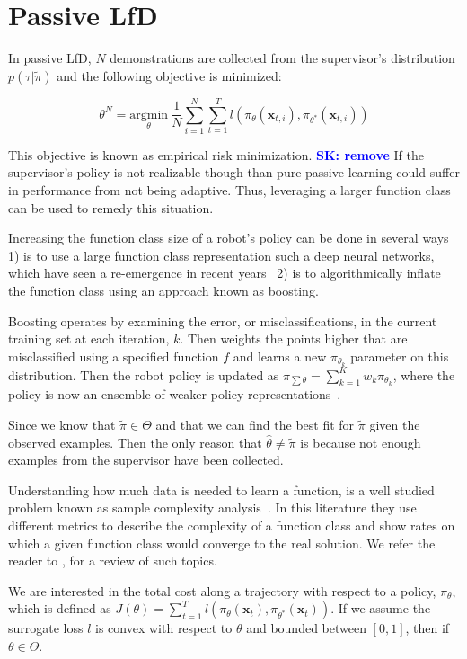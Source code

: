 \documentclass[10pt, conference]{ieeeconf}      %
\newcommand{\bx}{\mathbf{x}}
\newcommand{\sknote}[1]{\ifthenelse{ \boolean{include-notes}}%
 {\textcolor{blue}{\textbf{SK: #1}}}{}}
\begin{document}
 

\section{Passive LfD}
In passive LfD, $N$ demonstrations are collected from the supervisor's distribution $p(\tau|\tilde{\pi})$ and the following objective is minimized: 

$$\theta^N = \underset{\theta}{\mbox{argmin}} \: \frac{1}{N} \sum^N_{i=1} \sum^T_{t=1} l(\pi_{\theta}(\bx_{t,i}), \pi_{\theta^*}(\bx_{t,i}))$$

This objective is known as empirical risk minimization.\sknote{remove}
If the supervisor's policy is not realizable though than pure passive learning could suffer in performance from not being adaptive. 
Thus, leveraging a larger function class can be used to remedy this situation. 

Increasing the function class size of a robot's policy can be done in several ways 1) is to use a large function class representation such a deep neural networks, which have seen a re-emergence in recent years~\cite{levine2015end} 2) is to algorithmically inflate the function class using an approach known as boosting.

Boosting operates by examining the error, or misclassifications, in the current training set at each iteration, $k$. Then weights the points higher that are misclassified using a specified function $f$ and learns a new $\pi_{\theta_k}$ parameter on this distribution.  Then the robot policy is updated as $\pi_{\sum \theta} = \sum^K_{k=1} w_k \pi_{\theta_k}$, where the policy is now an ensemble of weaker policy representations~\cite{mason1999boosting}.


Since we know that $\tilde{\pi} \in \Theta$ and that we can find the best fit for $\tilde{\pi}$ given the observed examples. Then the only reason that $\hat{\theta} \neq \tilde{\pi}$ is because not enough examples from the supervisor have been collected. 

Understanding how much data is needed to learn a function, is a well studied problem known as sample complexity analysis~\cite{anthony2009neural}. In this literature they use different metrics to describe the complexity of a function class and show rates on which a given function class would converge to the real solution. We refer the reader to \cite{vapnik2013nature}, for a review of such topics. 

We are interested in the total cost along a trajectory with respect to a policy, $\pi_{\theta}$, which is defined as $J(\theta) = \sum^T_{t=1} l(\pi_{\theta}(\bx_{t}),\pi_{\theta^*}(\bx_{t}))$.  If we assume the surrogate loss $l$ is convex with respect to $\theta$ and bounded between $[0,1]$, then if $\theta \in \Theta$. \\
\end{document}
